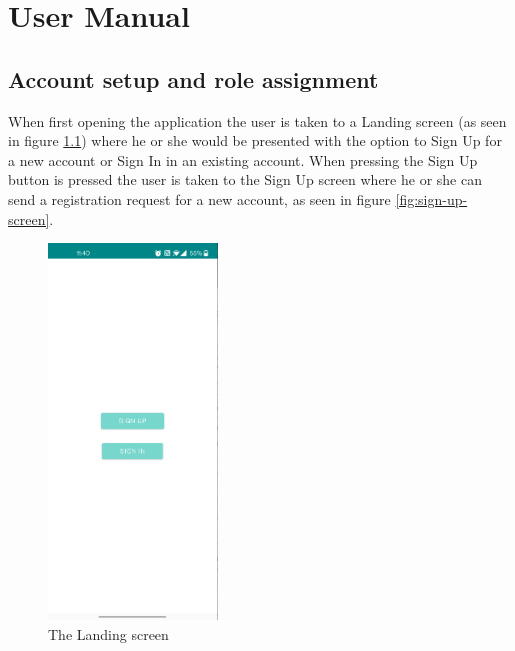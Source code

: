 \chapter{User Manual}
\label{chap:ch5}

\section{Account setup and role assignment}
\label{sec:ch5sec1}

\par When first opening the application the user is taken to a Landing screen (as seen in figure \ref{fig:landing-screen}) where he or she would be presented with the option to Sign Up for a new account or Sign In in an existing account. When pressing the Sign Up button is pressed the user is taken to the Sign Up screen where he or she can send a registration request for a new account, as seen in figure \ref{fig:sign-up-screen}.

\begin{figure}
\centering
\includegraphics[width=0.4\textwidth]{figures/landing_screen.png}
\caption{The Landing screen}
\label{fig:landing-screen}
\end{figure}

